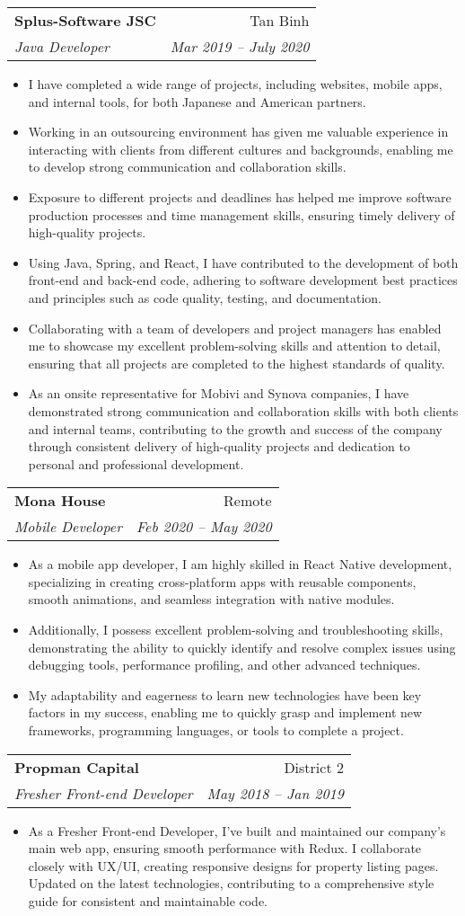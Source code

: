 \documentclass[letterpaper,11pt]{article}
\makeatletter
\newcommand{\resumeItem}[1]{
  \item\small{
    {#1 \vspace{-2pt}}
  }
}
\newcommand{\resumeSubheading}[4]{
  \vspace{-2pt}\item
    \begin{tabular*}{0.97\textwidth}[t]{l@{\extracolsep{\fill}}r}
      \textbf{#1} & #2 \\
      \textit{\small#3} & \textit{\small #4} \\
    \end{tabular*}\vspace{-7pt}
}
\newcommand{\resumeItemListStart}{\begin{itemize}}
\newcommand{\resumeItemListEnd}{\end{itemize}\vspace{-5pt}}
\makeatother
\begin{document}
    \resumeSubheading
      {Splus-Software JSC}{Tan Binh}
      {Java Developer}{Mar 2019 -- July 2020}
      \resumeItemListStart
        \resumeItem{I have completed a wide range of projects, including websites, mobile apps, and internal tools, for both Japanese and American partners.}
        \resumeItem{Working in an outsourcing environment has given me valuable experience in interacting with clients from different cultures and backgrounds, enabling me to develop strong communication and collaboration skills.}
        \resumeItem{Exposure to different projects and deadlines has helped me improve software production processes and time management skills, ensuring timely delivery of high-quality projects.}
        \resumeItem{Using Java, Spring, and React, I have contributed to the development of both front-end and back-end code, adhering to software development best practices and principles such as code quality, testing, and documentation.}
        \resumeItem{Collaborating with a team of developers and project managers has enabled me to showcase my excellent problem-solving skills and attention to detail, ensuring that all projects are completed to the highest standards of quality.}
        \resumeItem{As an onsite representative for Mobivi and Synova companies, I have demonstrated strong communication and collaboration skills with both clients and internal teams, contributing to the growth and success of the company through consistent delivery of high-quality projects and dedication to personal and professional development.}
      \resumeItemListEnd


    \resumeSubheading
      {Mona House}{Remote}
      {Mobile Developer}{Feb 2020 -- May 2020}
      \resumeItemListStart
        \resumeItem{As a mobile app developer, I am highly skilled in React Native development, specializing in creating cross-platform apps with reusable components, smooth animations, and seamless integration with native modules.}
        \resumeItem{Additionally, I possess excellent problem-solving and troubleshooting skills, demonstrating the ability to quickly identify and resolve complex issues using debugging tools, performance profiling, and other advanced techniques.}
        \resumeItem{My adaptability and eagerness to learn new technologies have been key factors in my success, enabling me to quickly grasp and implement new frameworks, programming languages, or tools to complete a project.}
      \resumeItemListEnd

    \resumeSubheading
      {Propman Capital}{District 2}
      {Fresher Front-end Developer}{May 2018 -- Jan 2019}
      \resumeItemListStart
        \resumeItem{As a Fresher Front-end Developer, I've built and maintained our company's main web app, ensuring smooth performance with Redux. I collaborate closely with UX/UI, creating responsive designs for property listing pages. Updated on the latest technologies, contributing to a comprehensive style guide for consistent and maintainable code.}
      \resumeItemListEnd
\end{document}
